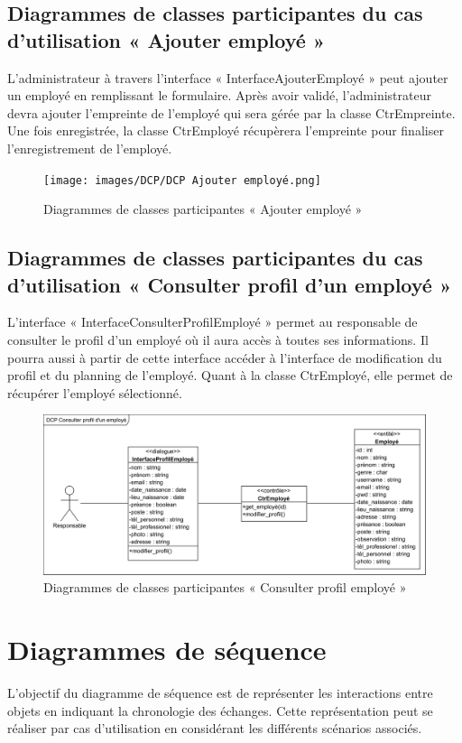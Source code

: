 \subsection*{Diagrammes de classes participantes du cas d'utilisation « Ajouter employé »}
L’administrateur à travers l’interface « InterfaceAjouterEmployé » peut ajouter
un employé en remplissant le formulaire. Après avoir validé, l’administrateur
devra ajouter l’empreinte de l’employé qui sera gérée par la classe
CtrEmpreinte.  Une fois enregistrée, la classe CtrEmployé récupèrera l’empreinte
pour finaliser l’enregistrement de l’employé. 

\clearpage

\begin{figure}[h!]
    \centering
    \texttt{[image: images/DCP/DCP Ajouter employé.png]}
    \caption{Diagrammes de classes participantes « Ajouter employé »}
    \label{fig31}
\end{figure}
        
\subsection*{Diagrammes de classes participantes du cas d'utilisation « Consulter profil d'un employé »}
L’interface « InterfaceConsulterProfilEmployé » permet au responsable de 
consulter le profil d’un employé où il aura accès à toutes ses informations. Il 
pourra aussi à partir de cette interface accéder à l’interface de modification
du profil et du planning de l’employé. Quant à la classe CtrEmployé, elle permet 
de récupérer l’employé sélectionné. 

\begin{figure}[h!]
    \centering
    \includegraphics[scale=0.72]{images/DCP/DCP_consulter_profil_d'un_employe.png}
    \caption{Diagrammes de classes participantes « Consulter profil employé »}
    \label{fig32}
\end{figure}
             
\section{Diagrammes de séquence}
L’objectif du diagramme de séquence est de représenter les interactions entre 
objets en indiquant la chronologie des échanges. Cette représentation peut se 
réaliser par cas d’utilisation en considérant les différents scénarios 
associés.\cite{9} 
    
